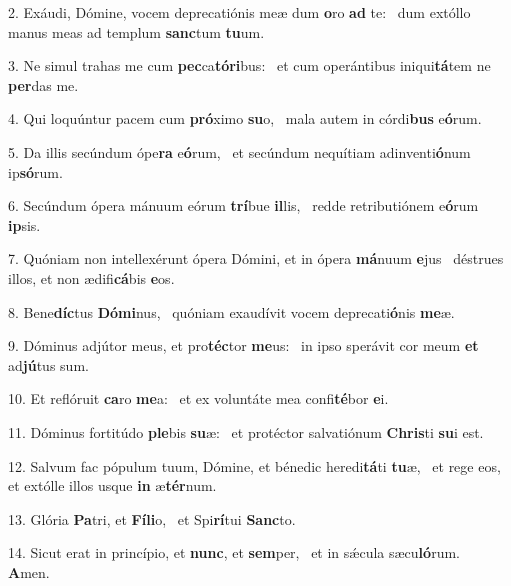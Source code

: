 2. Exáudi, Dómine, vocem deprecatiónis meæ dum \textbf{o}ro \textbf{ad} te: \ast\  dum extóllo manus meas ad templum \textbf{sanc}tum \textbf{tu}um.\

3. Ne simul trahas me cum \textbf{pec}ca\textbf{tó}\textbf{ri}bus: \ast\  et cum operántibus iniqui\textbf{tá}tem ne \textbf{per}das me.\

4. Qui loquúntur pacem cum \textbf{pró}ximo \textbf{su}o, \ast\  mala autem in córdi\textbf{bus} e\textbf{ó}rum.\

5. Da illis secúndum ópe\textbf{ra} e\textbf{ó}rum, \ast\  et secúndum nequítiam adinventi\textbf{ó}num ip\textbf{só}rum.\

6. Secúndum ópera mánuum eórum \textbf{trí}bue \textbf{il}lis, \ast\  redde retributiónem e\textbf{ó}rum \textbf{ip}sis.\

7. Quóniam non intellexérunt ópera Dómini, et in ópera \textbf{má}nuum \textbf{e}jus \ast\  déstrues illos, et non ædifi\textbf{cá}bis \textbf{e}os.\

8. Bene\textbf{díc}tus \textbf{Dó}\textbf{mi}nus, \ast\  quóniam exaudívit vocem deprecati\textbf{ó}nis \textbf{me}æ.\

9. Dóminus adjútor meus, et pro\textbf{téc}tor \textbf{me}us: \ast\  in ipso sperávit cor meum \textbf{et} ad\textbf{jú}tus sum.\

10. Et reflóruit \textbf{ca}ro \textbf{me}a: \ast\  et ex voluntáte mea confi\textbf{té}bor \textbf{e}i.\

11. Dóminus fortitúdo \textbf{ple}bis \textbf{su}æ: \ast\  et protéctor salvatiónum \textbf{Chris}ti \textbf{su}i est.\

12. Salvum fac pópulum tuum, Dómine, et bénedic heredi\textbf{tá}ti \textbf{tu}æ, \ast\  et rege eos, et extólle illos usque \textbf{in} æ\textbf{tér}num.\

13. Glória \textbf{Pa}tri, et \textbf{Fí}\textbf{li}o, \ast\  et Spi\textbf{rí}tui \textbf{Sanc}to.\

14. Sicut erat in princípio, et \textbf{nunc}, et \textbf{sem}per, \ast\  et in sǽcula sæcu\textbf{ló}rum. \textbf{A}men.\

